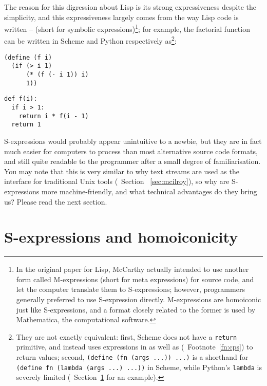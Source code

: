 The reason for this digression about Lisp is its strong expressiveness despite
the simplicity, and this expressiveness largely comes from the way Lisp code is
written --  (short for symbolic expressions)\footnote%
{In the original paper for Lisp, McCarthy actually
intended to use another form called M-expressions (short for meta expressions)
for source code, and let the computer translate them to S-expressions; however,
programmers generally preferred to use S-expression directly.  M-expressions are
homoiconic just like S-expressions, and a format closely related to the former
is used by Mathematica, the computational software.}; for example, the factorial
function can be written in Scheme and Python respectively as\footnote{They
are not exactly equivalent: first, Scheme does not have a \texttt{return}
primitive, and instead uses expressions in  as well as
 (\cf~Footnote~\ref{fn:cps}) to return values; second,
\texttt{(define (fn (args ...)) ...)} is a shorthand for \texttt{(define fn
(lambda (args ...) ...))} in Scheme, while Python's \texttt{lambda} is
severely limited (\cf~Section~\ref{sec:homoiconic} for an example).}:
\colskipa\begin{multicols}{2}
\begin{wquoting}
\begin{Verbatim}
(define (f i)
  (if (> i 1)
      (* (f (- i 1)) i)
      1))
\end{Verbatim}
\end{wquoting}
\begin{wquoting}
\begin{Verbatim}
def f(i):
  if i > 1:
    return i * f(i - 1)
  return 1
\end{Verbatim}
\end{wquoting}
\end{multicols}\colskipb\noindent%
S-expressions would probably appear unintuitive to a newbie, but they are in
fact much easier for computers to process than most alternative source code
formats, and still quite readable to the programmer after a small degree of
familiarisation.  You may note that this is very similar to why text streams
are used as the interface for traditional Unix tools (\cf~Section~%
\ref{sec:mcilroy}), so why are S-expressions more machine-friendly, and
what technical advantages do they bring us?  Please read the next section.

\newpart
\section{S-expressions and homoiconicity}\label{sec:homoiconic}

